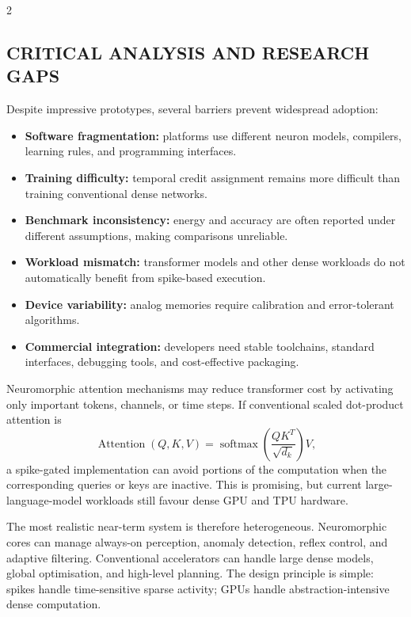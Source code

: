 \begin{multicols}{2}
  \subsection*{\centering\uppercase{Critical Analysis and Research Gaps}}
  Despite impressive prototypes, several barriers prevent widespread adoption:
  \begin{itemize}\justifying
    \item \textbf{Software fragmentation:} platforms use different neuron models, compilers, learning rules, and programming interfaces.
    \item \textbf{Training difficulty:} temporal credit assignment remains more difficult than training conventional dense networks.
    \item \textbf{Benchmark inconsistency:} energy and accuracy are often reported under different assumptions, making comparisons unreliable.
    \item \textbf{Workload mismatch:} transformer models and other dense workloads do not automatically benefit from spike-based execution.
    \item \textbf{Device variability:} analog memories require calibration and error-tolerant algorithms.
    \item \textbf{Commercial integration:} developers need stable toolchains, standard interfaces, debugging tools, and cost-effective packaging.
  \end{itemize}

  Neuromorphic attention mechanisms may reduce transformer cost by activating only important tokens, channels, or time steps. If conventional scaled dot-product attention is
  \[
    \operatorname{Attention}(Q,K,V)=
    \operatorname{softmax}\!\left(\frac{QK^{T}}{\sqrt{d_k}}\right)V,
  \]
  a spike-gated implementation can avoid portions of the computation when the corresponding queries or keys are inactive. This is promising, but current large-language-model workloads still favour dense GPU and TPU hardware.

  \begin{center}
\begin{minipage}{0.98\columnwidth}
\centering
    \arjunHybridFigure
\end{minipage}
  \end{center}

  The most realistic near-term system is therefore heterogeneous. Neuromorphic cores can manage always-on perception, anomaly detection, reflex control, and adaptive filtering. Conventional accelerators can handle large dense models, global optimisation, and high-level planning. The design principle is simple: spikes handle time-sensitive sparse activity; GPUs handle abstraction-intensive dense computation.


\end{multicols}
